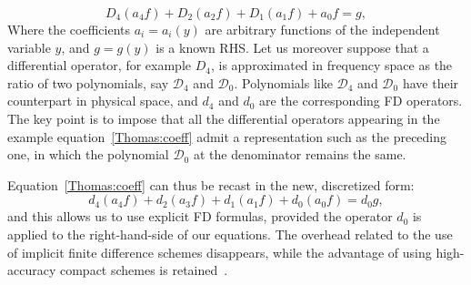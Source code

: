 \begin{equation}
D_{4}(a_{4}f) + D_{2}(a_{2}f)+D_{1}(a_{1}f)+a_{0}f = g,
\label{Thomas:coeff}
\end{equation}
Where the coefficients $a_{i}= a_{i}(y)$ are arbitrary functions of the independent variable $y$, and $g = g(y)$ is a known RHS. Let us moreover suppose that a differential operator, for example $D_{4}$, is approximated in frequency space as the ratio of two polynomials, say $\mathcal{D}_{4}$ and $\mathcal{D}_{0}$. Polynomials like $\mathcal{D}_{4}$ and $\mathcal{D}_{0}$ have their counterpart in physical space, and ${d}_{4}$ and $d_{0}$ are the corresponding FD operators. The key point is to impose that all the differential operators appearing in the example equation~\ref{Thomas:coeff} admit a representation such as the preceding one, in which the polynomial $\mathcal{D}_{0}$ at the denominator remains the same.\par
Equation~\ref{Thomas:coeff} can thus be recast in the new, discretized form:
\begin{equation}
d_{4} (a_{4}f) + d_{2} (a_{3}f) + d_{1} (a_{1}f) + d_{0} (a_{0}f) = d_{0} g,
\end{equation}
and this allows us to use explicit FD formulas, provided the operator $d_{0}$ is applied to the right-hand-side of our equations. The overhead related to the use of implicit finite difference schemes disappears, while the advantage of using high-accuracy compact schemes is retained~\cite{ns:quadrio}.





